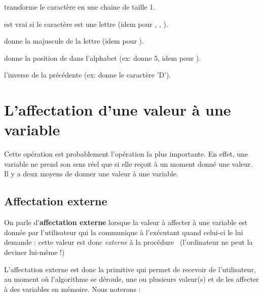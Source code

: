 			\begin{liste}
			\item {} transforme le caractère  en une chaine de taille 1.
			\item {} est vrai si le caractère  est une lettre
				(idem pour , 
				, 
				).
			\item {} donne la majuscule de la lettre 
				(idem pour ).
			\item {} donne la position de  dans l'alphabet (ex:  donne 5, 
			idem pour ).
			\item {} l'inverse de la précédente (ex:  donne le caractère 'D').
			\end{liste}

			 
	\section{L’affectation d’une valeur à une variable}

		Cette opération est probablement l’opération la plus importante. En
		effet, une variable ne prend son sens réel que si elle reçoit à un
		moment donné une valeur. Il y a deux moyens de donner une valeur à une
		variable.

		\subsection{Affectation externe }

			On parle d’\textbf{affectation externe} lorsque la valeur à affecter à
			une variable est donnée par l’utilisateur qui la communique à
			l’exécutant quand celui-ci le lui demande : cette valeur est donc
			\textit{externe} à la procédure \ (l’ordinateur ne peut la deviner
			lui-même !)

			L’affectation externe est donc la primitive qui permet de recevoir de
			l’utilisateur, au moment où l'algorithme se déroule,
			une ou plusieurs valeur(s) et de les affecter à des variables en
			mémoire. Nous noterons :

			

